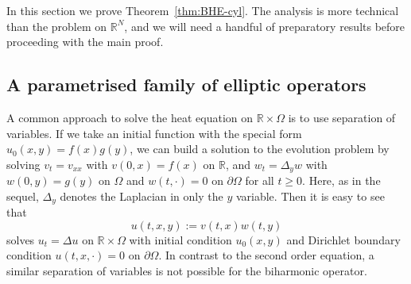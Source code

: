 \documentclass[a4paper, reqno,titlepage]{amsart}
\numberwithin{equation}{section}
\theoremstyle{plain}
\theoremstyle{definition}
\theoremstyle{remark}
\newcommand{\RR}{\mathbb{R}}
\begin{document}
In this section we prove Theorem~\ref{thm:BHE-cyl}. The analysis is more technical than the problem on $\RR^N$, and we will need a handful of preparatory results before proceeding with the main proof.

\subsection{A parametrised family of elliptic operators}

A common approach to solve the heat equation on $\RR\times\Omega$ is to use separation of variables. If we take an initial function with the special form $u_0(x,y) = f(x)g(y)$, we can build a solution to the evolution problem by solving $v_t = v_{xx}$ with $v(0, x) = f(x)$ on $\RR$, and $w_t = \Delta_y w$ with $w(0, y) = g(y)$ on $\Omega$ and $w(t, \cdot) = 0$ on $\partial\Omega$ for all $t \geq 0$. Here, as in the sequel, $\Delta_y$ denotes the Laplacian in only the $y$ variable. Then it is easy to see that
\begin{equation*}
  u(t,x,y) := v(t,x) w(t, y)
\end{equation*}
solves $u_t = \Delta u$ on $\RR \times \Omega$ with initial condition $u_0(x,y)$ and Dirichlet boundary condition $u(t, x, \cdot) = 0$ on $\partial\Omega$. In contrast to the second order equation, a similar separation of variables is not possible for the biharmonic operator.
\end{document}
